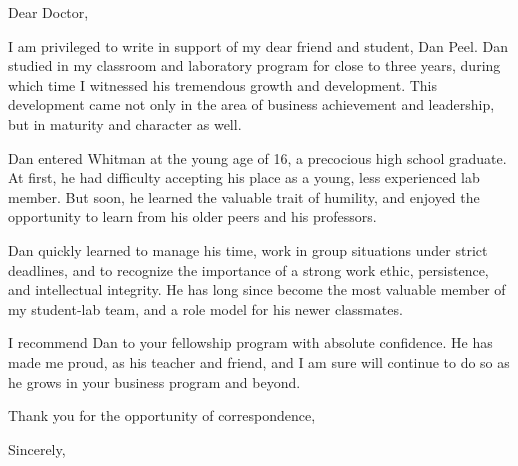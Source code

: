 \documentclass[a4paper]{article}
\begin{document}
Dear Doctor, 

I am privileged to write in support of my dear friend and student, Dan Peel. Dan studied in my classroom and
laboratory program for close to three years, during which time I witnessed his tremendous growth and development. This
development came not only in the area of business achievement and leadership, but in maturity and character as well.

Dan entered Whitman at the young age of 16, a precocious high school graduate. At first, he had difficulty accepting his
place as a young, less experienced lab member. But soon, he learned the valuable trait of humility, and enjoyed the
opportunity to learn from his older peers and his professors.

Dan quickly learned to manage his time, work in group situations under strict deadlines, and to recognize the importance
of a strong work ethic, persistence, and intellectual integrity. He has long since become the most valuable member of
my student-lab team, and a role model for his newer classmates.

I recommend Dan to your fellowship program with absolute confidence. He has made me proud, as his teacher and friend,
and I am sure will continue to do so as he grows in your business program and beyond.

Thank you for the opportunity of correspondence,

Sincerely,
\end{document}
